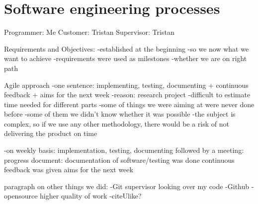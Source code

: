 \section{Software engineering processes}
\label{s:processes}
Programmer: Me
Customer: Tristan
Supervisor: Tristan

Requirements and Objectives:
	-established at the beginning
		-so we now what we want to achieve
	-requirements were used as milestones
		-whether we are on right path

Agile approach
	-one sentence: implementing, testing, documenting + continuous feedback + aims for the next week
	-reason: research project
		-difficult to estimate time needed for different parts
			-some of things we were aiming at were never done before
			-some of them we didn't know whether it was possible
		-the subject is complex, so if we use any other methodology, there would be a risk of not delivering the product on time
			
	-on weekly basis:
		implementation, testing, documenting
		followed by a meeting:
			progress document:
				documentation of software/testing was done
			continuous feedback was given
			aims for the next week
			
paragraph on other things we did:
	-Git
		supervisor looking over my code
	-Github - opensource
		higher quality of work
	-citeUlike?
	